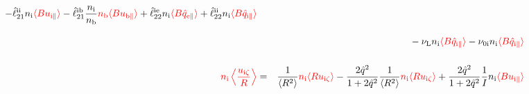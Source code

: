 \documentclass[11pt]{article}
\def\r#1{{\rm#1}}
\def\ave#1{\left\langle#1\right\rangle}
\def\aves#1{\langle#1\rangle}
\def\para{\parallel}
\def\ni{n_\r{i}}
\def\nb{n_\r{b}}
\def\uizt{u_{\r{i}\zeta}}
\def\uipara{u_{\r{i}\para}}
\def\ubpara{u_{\r{b}\para}}
\def\qhatepara{\hat{q}_{\r{e}\para}}
\def\qhatipara{\hat{q}_{\r{i}\para}}
\def\nuni{\nu_\r{0i}}
\def\nuL{\nu_\r{L}}
\def\red#1{\textcolor{red}{#1}}
\begin{document}
\begin{eqnarray}
  - \hat{\ell}_{21}^{\r{ii}} \ni \red{\aves{B \uipara}} 
  - \hat{\ell}_{21}^{\r{ib}} \frac{\ni}{\nb} \red{\nb \aves{B \ubpara}} 
%
  + \hat{\ell}_{22}^{\r{ie}} \ni \red{\aves{B \qhatepara}} 
  + \hat{\ell}_{22}^{\r{ii}} \ni \red{\aves{B \qhatipara}} 
\nonumber\\[3mm]&&{}
%
  - \nuL \ni \red{\aves{B \qhatipara}}
%
  - \nuni \ni \red{\aves{B \qhatipara}}
\\[5mm]
    \red{\ni \ave{\frac{\uizt}{R}}} &=&
%
    \frac{1}{\aves{R^2}} \red{\ni \aves{R\uizt}}
%
  - \frac{2\hat{q}^2}{1+2\hat{q}^2} \frac{1}{\aves{R^2}}\red{\ni\aves{R\uizt}}
%
  + \frac{2\hat{q}^2}{1+2\hat{q}^2} \frac{1}{I}\ni \red{\aves{B\uipara}}
\end{eqnarray}
%
\end{document}
